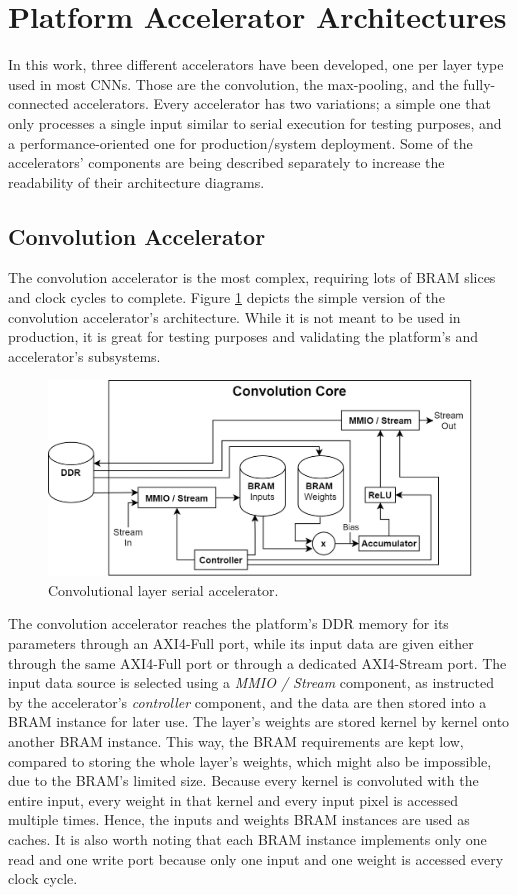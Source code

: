 \section{Platform Accelerator Architectures}
In this work, three different accelerators have been developed, one per layer type used in most CNNs. Those are the convolution, the max-pooling, and the fully-connected accelerators. Every accelerator has two variations; a simple one that only processes a single input similar to serial execution for testing purposes, and a performance-oriented one for production/system deployment. Some of the accelerators' components are being described separately to increase the readability of their architecture diagrams.

\subsection{Convolution Accelerator}
The convolution accelerator is the most complex, requiring lots of BRAM slices and clock cycles to complete. Figure \ref{fig:conv-core-serial} depicts the simple version of the convolution accelerator's architecture. While it is not meant to be used in production, it is great for testing purposes and validating the platform's and accelerator's subsystems.

\begin{figure} [H]
	\centering
	\includegraphics[width=\textwidth]{Images/Platform/Conv_core_serial.png}
	\decoRule
	\caption[Convolutional layer serial accelerator]{Convolutional layer serial accelerator.}
	\label{fig:conv-core-serial}
\end{figure}

The convolution accelerator reaches the platform's DDR memory for its parameters through an AXI4-Full port, while its input data are given either through the same AXI4-Full port or through a dedicated AXI4-Stream port. The input data source is selected using a \emph{MMIO / Stream} component, as instructed by the accelerator's \emph{controller} component, and the data are then stored into a BRAM instance for later use. The layer's weights are stored kernel by kernel onto another BRAM instance. This way, the BRAM requirements are kept low, compared to storing the whole layer's weights, which might also be impossible, due to the BRAM's limited size. Because every kernel is convoluted with the entire input, every weight in that kernel and every input pixel is accessed multiple times. Hence, the inputs and weights BRAM instances are used as caches. It is also worth noting that each BRAM instance implements only one read and one write port because only one input and one weight is accessed every clock cycle.

